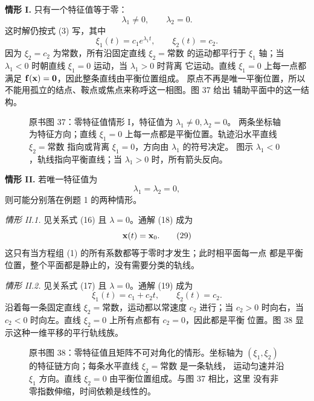 \medskip
\noindent\textbf{情形 I.}
只有一个特征值等于零：
\begin{equation}
 \lambda_1\neq0,\qquad\lambda_2=0.
 \tag{26}
\end{equation}
这时解仍按式 (3) 写，其中
\begin{equation}
 \xi_1(t)=c_1e^{\lambda_1t},\qquad
 \xi_2(t)=c_2.
 \tag{27}
\end{equation}
因为 \(\xi_2=c_2\) 为常数，所有沿固定直线 \(\xi_2=\text{常数}\) 的运动都平行于
\(\xi_1\) 轴；当 \(\lambda_1<0\) 时朝直线 \(\xi_1=0\) 运动，当 \(\lambda_1>0\) 时背离
它运动。直线 \(\xi_1=0\) 上每一点都满足 \(\vect{f}(\vect{x})=\vect{0}\)，因此整条直线由平衡位置组成。
原点不再是唯一平衡位置，所以不能用孤立的结点、鞍点或焦点来称呼这一相图。图 37 给出
辅助平面中的这一结构。

\begin{figure}[H]
 \centering
 
 \caption{原书图 37：零特征值情形 I，特征值为 \(\lambda_1\neq0,\lambda_2=0\)。
 两条坐标轴为特征方向；直线 \(\xi_1=0\) 上每一点都是平衡位置。轨迹沿水平直线
 \(\xi_2=\text{常数}\) 指向或背离 \(\xi_1=0\)，方向由 \(\lambda_1\) 的符号决定。
 图示 \(\lambda_1<0\)，轨线指向平衡直线；当 \(\lambda_1>0\) 时，所有箭头反向。}
 \label{fig:ch2-p2-37}
\end{figure}

\medskip
\noindent\textbf{情形 II.}
若唯一特征值为
\begin{equation}
 \lambda_1=\lambda_2=0,
 \tag{28}
\end{equation}
则可能分别落在例题 1 的两种情形。

\emph{情形 II.1.} 见关系式 (16) 且 \(\lambda=0\)。通解
(18) 成为
\begin{equation}
 \vect{x}(t)=\vect{x}_0.
 \tag{29}
\end{equation}
这只有当方程组 (1) 的所有系数都等于零时才发生；此时相平面每一点
都是平衡位置，整个平面都是静止的，没有需要分类的轨线。

\emph{情形 II.2.} 见关系式 (17) 且 \(\lambda=0\)。通解
(19) 成为
\begin{equation}
 \xi_1(t)=c_1+c_2t,\qquad
 \xi_2(t)=c_2.
 \tag{30}
\end{equation}
沿着每一条固定直线 \(\xi_2=\text{常数}\)，运动都以常速度 \(c_2\) 进行；当 \(c_2>0\)
时向右，当 \(c_2<0\) 时向左。直线 \(\xi_2=0\) 上所有点都有 \(c_2=0\)，因此都是平衡
位置。图 38 显示这种一维平移的平行轨线族。

\begin{figure}[H]
 \centering
 
 \caption{原书图 38：零特征值且矩阵不可对角化的情形。坐标轴为
 \((\xi_1,\xi_2)\) 的特征链方向；每条水平直线 \(\xi_2=\text{常数}\) 是一条轨线，
 运动匀速并沿 \(\xi_1\) 方向。直线 \(\xi_2=0\) 由平衡位置组成。与图 37 相比，这里
 没有非零指数伸缩，时间依赖是线性的。}
 \label{fig:ch2-p2-38}
\end{figure}
